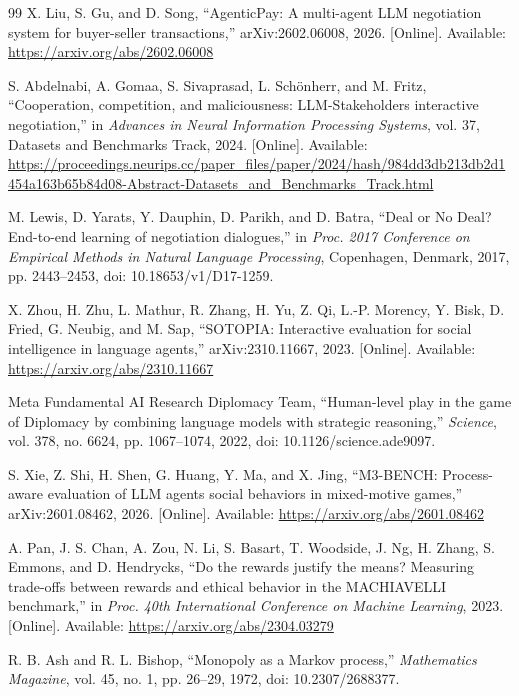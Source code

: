 \documentclass[conference]{IEEEtran}
\begin{document}
\begin{thebibliography}{99}
X. Liu, S. Gu, and D. Song, ``AgenticPay: A multi-agent LLM negotiation system for buyer-seller transactions,'' arXiv:2602.06008, 2026. [Online]. Available: \url{https://arxiv.org/abs/2602.06008}

S. Abdelnabi, A. Gomaa, S. Sivaprasad, L. Sch\"onherr, and M. Fritz, ``Cooperation, competition, and maliciousness: LLM-Stakeholders interactive negotiation,'' in \emph{Advances in Neural Information Processing Systems}, vol. 37, Datasets and Benchmarks Track, 2024. [Online]. Available: \url{https://proceedings.neurips.cc/paper_files/paper/2024/hash/984dd3db213db2d1454a163b65b84d08-Abstract-Datasets_and_Benchmarks_Track.html}

M. Lewis, D. Yarats, Y. Dauphin, D. Parikh, and D. Batra, ``Deal or No Deal? End-to-end learning of negotiation dialogues,'' in \emph{Proc. 2017 Conference on Empirical Methods in Natural Language Processing}, Copenhagen, Denmark, 2017, pp. 2443--2453, doi: 10.18653/v1/D17-1259.

X. Zhou, H. Zhu, L. Mathur, R. Zhang, H. Yu, Z. Qi, L.-P. Morency, Y. Bisk, D. Fried, G. Neubig, and M. Sap, ``SOTOPIA: Interactive evaluation for social intelligence in language agents,'' arXiv:2310.11667, 2023. [Online]. Available: \url{https://arxiv.org/abs/2310.11667}

Meta Fundamental AI Research Diplomacy Team, ``Human-level play in the game of Diplomacy by combining language models with strategic reasoning,'' \emph{Science}, vol. 378, no. 6624, pp. 1067--1074, 2022, doi: 10.1126/science.ade9097.

S. Xie, Z. Shi, H. Shen, G. Huang, Y. Ma, and X. Jing, ``M3-BENCH: Process-aware evaluation of LLM agents social behaviors in mixed-motive games,'' arXiv:2601.08462, 2026. [Online]. Available: \url{https://arxiv.org/abs/2601.08462}

A. Pan, J. S. Chan, A. Zou, N. Li, S. Basart, T. Woodside, J. Ng, H. Zhang, S. Emmons, and D. Hendrycks, ``Do the rewards justify the means? Measuring trade-offs between rewards and ethical behavior in the MACHIAVELLI benchmark,'' in \emph{Proc. 40th International Conference on Machine Learning}, 2023. [Online]. Available: \url{https://arxiv.org/abs/2304.03279}

R. B. Ash and R. L. Bishop, ``Monopoly as a Markov process,'' \emph{Mathematics Magazine}, vol. 45, no. 1, pp. 26--29, 1972, doi: 10.2307/2688377.


\end{thebibliography}
\end{document}
